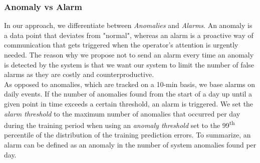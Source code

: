    \subsubsection{Anomaly vs Alarm}
    \label{subsub:anvsal}
      In our approach, we differentiate between \emph{Anomalies} and \emph{Alarms}. An anomaly is a data point that deviates from "normal", whereas an alarm is a proactive 
      way of communication that gets triggered when the operator's attention is urgently needed. The reason why we propose not to send an alarm every time an anomaly is 
      detected by the system is that we want our system to limit the number of false alarms as they are costly and counterproductive.\\
      As opposed to anomalies, which are tracked on a 10-min basis, we base alarms on daily events. If the number of anomalies found from the start of a day up until a given 
      point in time exceeds a certain threshold, an alarm is triggered. We set the \emph{alarm threshold} to the maximum number of 
      anomalies that occurred per day during the training period when using an \emph{anomaly threshold} set to the 99\textsuperscript{th} percentile of the distribution of the 
      training prediction errors. To summarize, an alarm can be defined as an anomaly in the number of system anomalies found per day.\\
  

